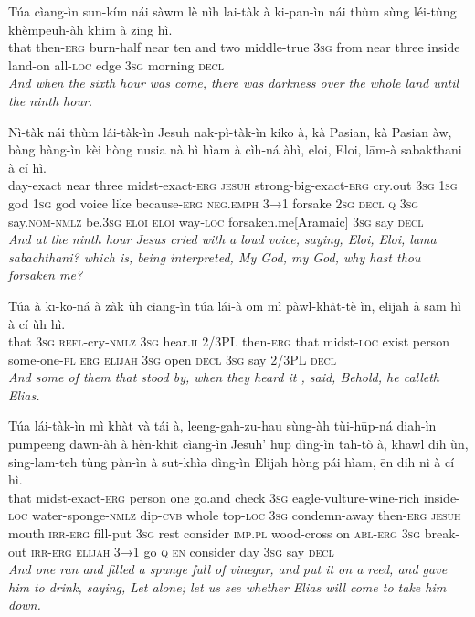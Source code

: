 \documentclass[11pt,a4paper]{article}
\begin{document}
\begin{exe}
\gll Túa cìang-ìn sun-kím nái sàwm lè nìh lai-tàk à ki-pan-ìn nái thùm sùng léi-tùng khèmpeuh-àh khim à zing hì. \\
     that then-\textsc{erg} burn-half near ten and two middle-true \textsc{3sg} from near three inside land-on all-\textsc{loc} edge \textsc{3sg} morning \textsc{decl} \\
\glt \textcolor{kjvcolor}{\textit{And when the sixth hour was come, there was darkness over the whole land until the ninth hour.}}

\gll Nì-tàk nái thùm lái-tàk-ìn Jesuh nak-pì-tàk-ìn kiko à, kà Pasian, kà Pasian àw, bàng hàng-ìn kèi hòng nusia nà hì hìam à cìh-ná àhì, eloi, Eloi, lām-à sabakthani à cí hì. \\
     day-exact near three midst-exact-\textsc{erg} \textsc{jesuh} strong-big-exact-\textsc{erg} cry.out \textsc{3sg} \textsc{1sg} god \textsc{1sg} god voice like because-\textsc{erg} \textsc{neg}.\textsc{emph} \textsc{3→1} forsake \textsc{2sg} \textsc{decl} \textsc{q} \textsc{3sg} say.\textsc{nom}-\textsc{nmlz} be.\textsc{3sg} \textsc{eloi} \textsc{eloi} way-\textsc{loc} forsaken.me[Aramaic] \textsc{3sg} say \textsc{decl} \\
\glt \textcolor{kjvcolor}{\textit{And at the ninth hour Jesus cried with a loud voice, saying, Eloi, Eloi, lama sabachthani? which is, being interpreted, My God, my God, why hast thou forsaken me?}}

\gll Túa à kī-ko-ná à zàk ùh cìang-ìn túa lái-à ōm mì pàwl-khàt-tè ìn, elijah à sam hì à cí ùh hì. \\
     that \textsc{3sg} \textsc{refl}-cry-\textsc{nmlz} \textsc{3sg} hear.\textsc{ii} 2/3PL then-\textsc{erg} that midst-\textsc{loc} exist person some-one-\textsc{pl} \textsc{erg} \textsc{elijah} \textsc{3sg} open \textsc{decl} \textsc{3sg} say 2/3PL \textsc{decl} \\
\glt \textcolor{kjvcolor}{\textit{And some of them that stood by, when they heard it , said, Behold, he calleth Elias.}}

\gll Túa lái-tàk-ìn mì khàt và tái à, leeng-gah-zu-hau sùng-àh tùi-hūp-ná diah-ìn pumpeeng dawn-àh à hèn-khit cìang-ìn Jesuh' hūp dìng-ìn tah-tò à, khawl dih ùn, sing-lam-teh tùng pàn-ìn à sut-khìa dìng-ìn Elijah hòng pái hìam, ēn dih nì à cí hì. \\
     that midst-exact-\textsc{erg} person one go.and check \textsc{3sg} eagle-vulture-wine-rich inside-\textsc{loc} water-sponge-\textsc{nmlz} dip-\textsc{cvb} whole top-\textsc{loc} \textsc{3sg} condemn-away then-\textsc{erg} \textsc{jesuh} mouth \textsc{irr}-\textsc{erg} fill-put \textsc{3sg} rest consider \textsc{imp}.\textsc{pl} wood-cross on \textsc{abl}-\textsc{erg} \textsc{3sg} break-out \textsc{irr}-\textsc{erg} \textsc{elijah} \textsc{3→1} go \textsc{q} \textsc{en} consider day \textsc{3sg} say \textsc{decl} \\
\glt \textcolor{kjvcolor}{\textit{And one ran and filled a spunge full of vinegar, and put it on a reed, and gave him to drink, saying, Let alone; let us see whether Elias will come to take him down.}}


\end{exe}
\end{document}
